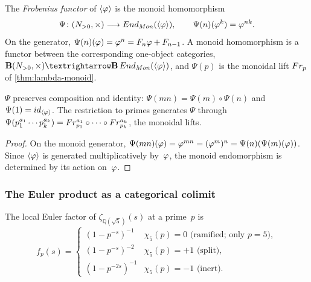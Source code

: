 \begin{definition}\label{def:frobenius-functor}
The \emph{Frobenius functor} of $\langle\varphi\rangle$ is the
monoid homomorphism
\begin{equation}\label{eq:Psi-functor}
  \Psi\colon (N_{>0},\times)
  \longrightarrow End_{Mon}(\langle\varphi\rangle),
  \qquad
  \Psi(n)(\varphi^k) = \varphi^{nk}.
\end{equation}
On the generator, $\Psi(n)(\varphi) = \varphi^n = F_n\varphi + F_{n-1}$.  A monoid homomorphism is a functor between
the corresponding one-object categories, $\mathbf B(\N_{>0},\times)\to\mathbf B\,\mathrm{End}_{\mathrm{Mon}}(\langle\golden\rangle)$,
and $\Psi(p)$ is the monoidal lift $Fr_p$ of \cref{thm:lambda-monoid}.
\end{definition}

\begin{proposition}\label{prop:Psi-functorial}
$\Psi$ preserves composition and identity:
$\Psi(mn) = \Psi(m)\circ\Psi(n)$ and
$\Psi(1) = id_{\langle\varphi\rangle}$.
The restriction to primes generates $\Psi$ through
$\Psi(p_1^{a_1}\cdots p_k^{a_k}) = Fr_{p_1}^{a_1}\circ\cdots\circ Fr_{p_k}^{a_k}$, the monoidal lifts.
\end{proposition}

\begin{proof}
On the monoid generator,
$\Psi(mn)(\varphi) = \varphi^{mn} = (\varphi^m)^n
= \Psi(n)(\Psi(m)(\varphi))$.  Since $\langle\varphi\rangle$
is generated multiplicatively by~$\varphi$, the monoid
endomorphism is determined by its action on~$\varphi$.
\end{proof}


\subsubsection{The Euler product as a categorical colimit}
\label{ssec:euler-colimit}

\begin{definition}\label{prop:local-factors}
The local Euler factor of $\zeta_{\mathbb{Q}(\sqrt{5})}(s)$ at a
prime~$p$ is
\[
  f_p(s) = \begin{cases}
    (1-p^{-s})^{-1}   & \chi_5(p) = 0  \text{ (ramified; only }p=5\text{)},\\
    (1-p^{-s})^{-2}   & \chi_5(p) = +1 \text{ (split)},\\
    (1-p^{-2s})^{-1}  & \chi_5(p) = -1 \text{ (inert)}.
  \end{cases}
\]
\end{definition}


